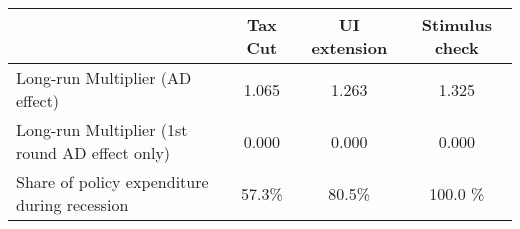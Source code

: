 \begin{tabular}{@{}lccc@{}} 
\toprule 
& Tax Cut    & UI extension    & Stimulus check    \\  \midrule 
Long-run Multiplier (AD effect) &1.065  & 1.263  & 1.325     \\ 
Long-run Multiplier (1st round AD effect only) &0.000  & 0.000  & 0.000     \\ 
Share of policy expenditure during recession &57.3\%  & 80.5\%  & 100.0 \%    \\ 
\end{tabular}  
